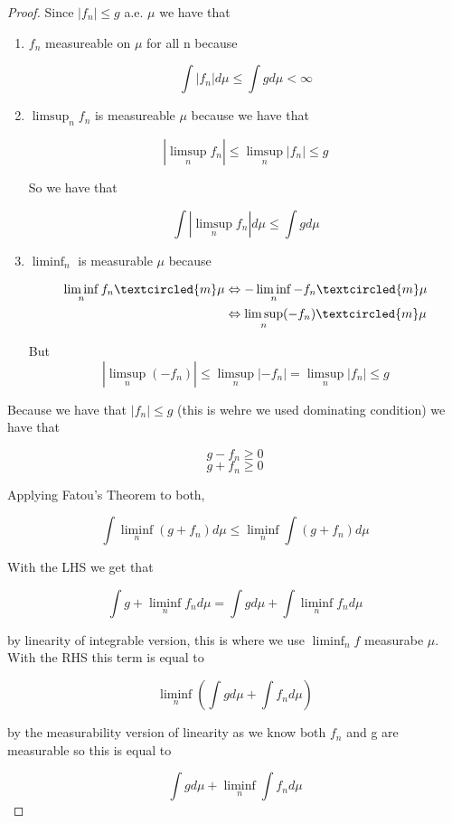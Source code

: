\documentclass[11pt,fleqn]{book} %
\begin{document}
\begin{proof}
	Since $|f_n| \leq g$ a.e. $\mu$ we have that

		\begin{enumerate}
			\item $f_n $ measureable on $\mu$ for all n because

					$$\int |f_n| d\mu \leq \int g d\mu < \infty $$
			
			\item $\limsup_n f_n $ is measureable $\mu$ because we have that 

					$$| \limsup_n f_n| \leq \limsup_n |f_n| \leq g  $$

			So we have that

					$$ \int | \limsup_n f_n| d\mu  \leq \int g d\mu$$
			\item $\liminf_n$ is measurable $\mu$ because

				\begin{align*}
					\liminf_n f_n \textcircled{m} \mu &\Leftrightarrow - \liminf_n -f_n \textcircled{m} \mu\\
							&\Leftrightarrow \limsup_n (-f_n) \textcircled{m} \mu\\
				\end{align*}

				But
						$$|\limsup_n (-f_n)| \leq \limsup_n |-f_n| = \limsup_n |f_n| \leq g $$
		\end{enumerate}


	Because we have that $|f_n| \leq g$ (this is wehre we used dominating condition) we have that

			$$g - f_n \geq 0 $$
			$$g + f_n \geq 0 $$

	Applying Fatou's Theorem to both, 

			$$\int \liminf_n (g+ f_n) d\mu \leq \liminf_n \int (g+f_n) d\mu $$

	With the LHS we get that

			$$\int g+ \liminf_n f_n d\mu = \int g d\mu + \int \liminf_n f_n d\mu $$

	by linearity of integrable version, this is where we use $\liminf_n f$ measurabe $\mu$.\\

	With the RHS this term is equal to 

			$$\liminf_n (\int g d\mu + \int f_n d\mu) $$

	by the measurability version of linearity as we know both $f_n$ and g are measurable so this is equal to 

			$$\int g d\mu + \liminf_n \int f_n d\mu $$


\end{proof}
\end{document}
